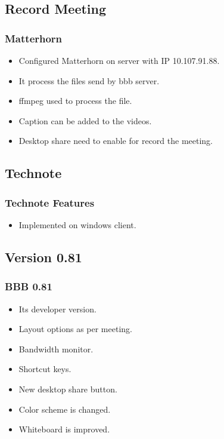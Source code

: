 \documentclass{beamer}
\begin{document}
\subsection{Record Meeting}
\begin{frame}
\frametitle{Matterhorn}
\begin{itemize}

\item Configured Matterhorn on server with IP 10.107.91.88.\pause
\item It process the files send by bbb server. \pause
\item ffmpeg used to process the file.\pause
\item Caption can be added to the videos.\pause
\item Desktop share need to enable for record the meeting.
\end{itemize}
\end{frame}

\subsection{Technote}
\begin{frame}
\frametitle{Technote Features}
\begin{itemize}

\item Implemented on windows client.
\end{itemize}
\end{frame}

\subsection{Version 0.81}
\begin{frame}
\frametitle{BBB 0.81}
\begin{itemize}

\item Its developer version.\pause
\item Layout options as per meeting.\pause
\item Bandwidth monitor.\pause
\item Shortcut keys.\pause
\item New desktop share button.\pause
\item Color scheme is changed.\pause
\item Whiteboard is improved. 
\end{itemize}
\end{frame}
\end{document}

